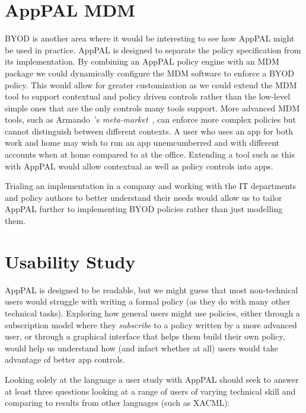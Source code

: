 \documentclass[thesis.tex]{subfiles}
\begin{document}
\section{AppPAL MDM}

BYOD is another area where it would be interesting to see how AppPAL might be
used in practice. AppPAL is designed to separate the policy specification from
its implementation. By combining an AppPAL policy engine with an MDM package we
could dynamically configure the MDM software to enforce a BYOD policy. This
would allow for greater customization as we could extend the MDM tool to support
contextual and policy driven controls rather than the low-level simple ones that
are the only controls many tools support. More advanced MDM tools, such as
Armando~\etal's \emph{meta-market}~\cite{armando_enabling_2014}, can enforce
more complex policies but cannot distinguish between different contexts. A user
who uses an app for both work and home may wish to run an app unemcumberred and
with different accounts when at home compared to at the office. Extending a tool
such as this with AppPAL would allow contextual as well as policy controls into
apps.

Trialing an implementation in a company and working with the IT departments and
policy authors to better understand their needs would allow us to tailor AppPAL
further to implementing BYOD policies rather than just modelling them.

\section{Usability Study}

AppPAL is designed to be readable, but we might guess that most non-technical
users would struggle with writing a formal policy (as they do with many other
technical tasks). Exploring how general users might use policies, either through
a subscription model where they \emph{subscribe} to a policy written by a more
advanced user, or through a graphical interface that helps them build their own
policy, would help us understand how (and infact whether at all) users would
take advantage of better app controls.

Looking solely at the language a user study with AppPAL should seek to answer at
least three questions looking at a range of users of varying technical skill and
comparing to results from other languages (such as XACML):
\end{document}
